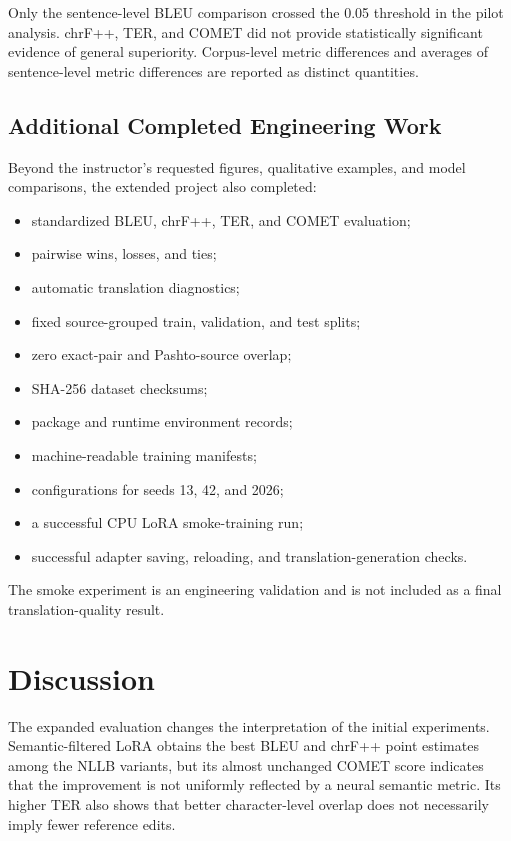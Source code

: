 \documentclass[conference]{IEEEtran}
\begin{document}
Only the sentence-level BLEU comparison crossed the
0.05 threshold in the pilot analysis. chrF++, TER, and COMET
did not provide statistically significant evidence of general
superiority. Corpus-level metric differences and averages of
sentence-level metric differences are reported as distinct
quantities.

\subsection{Additional Completed Engineering Work}

Beyond the instructor's requested figures, qualitative
examples, and model comparisons, the extended project also
completed:

\begin{itemize}
    \item standardized BLEU, chrF++, TER, and COMET
    evaluation;
    \item pairwise wins, losses, and ties;
    \item automatic translation diagnostics;
    \item fixed source-grouped train, validation, and
    test splits;
    \item zero exact-pair and Pashto-source overlap;
    \item SHA-256 dataset checksums;
    \item package and runtime environment records;
    \item machine-readable training manifests;
    \item configurations for seeds 13, 42, and 2026;
    \item a successful CPU LoRA smoke-training run;
    \item successful adapter saving, reloading, and
    translation-generation checks.
\end{itemize}

The smoke experiment is an engineering validation and is
not included as a final translation-quality result.

\section{Discussion}

The expanded evaluation changes the interpretation of the
initial experiments. Semantic-filtered LoRA obtains the best
BLEU and chrF++ point estimates among the NLLB variants,
but its almost unchanged COMET score indicates that the
improvement is not uniformly reflected by a neural semantic
metric. Its higher TER also shows that better character-level
overlap does not necessarily imply fewer reference edits.
\end{document}
